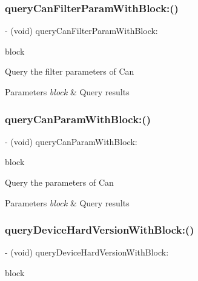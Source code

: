 \subsubsection{\texorpdfstring{query\+Can\+Filter\+Param\+With\+Block\+:()}{queryCanFilterParamWithBlock:()}}
{\footnotesize\ttfamily -\/ (void) query\+Can\+Filter\+Param\+With\+Block\+: \begin{DoxyParamCaption}\item[{(P\+V\+Query\+Can\+Filter\+Param\+Block)}]{block }\end{DoxyParamCaption}}

Query the filter parameters of Can


\begin{DoxyParams}{Parameters}
{\em block} & Query results \\
\hline
\end{DoxyParams}
\mbox{\label{interface_p_v_mount_a239b470716dbb17b1a10326cceaf186f}} 
\subsubsection{\texorpdfstring{query\+Can\+Param\+With\+Block\+:()}{queryCanParamWithBlock:()}}
{\footnotesize\ttfamily -\/ (void) query\+Can\+Param\+With\+Block\+: \begin{DoxyParamCaption}\item[{(P\+V\+Query\+Can\+Param\+Block)}]{block }\end{DoxyParamCaption}}

Query the parameters of Can


\begin{DoxyParams}{Parameters}
{\em block} & Query results \\
\hline
\end{DoxyParams}
\mbox{\label{interface_p_v_mount_a0b34e8f710a1ff6d4c1d4eeb358f1675}} 
\subsubsection{\texorpdfstring{query\+Device\+Hard\+Version\+With\+Block\+:()}{queryDeviceHardVersionWithBlock:()}}
{\footnotesize\ttfamily -\/ (void) query\+Device\+Hard\+Version\+With\+Block\+: \begin{DoxyParamCaption}\item[{(P\+V\+S\+D\+K\+Query\+Device\+Version\+Block)}]{block }\end{DoxyParamCaption}}

